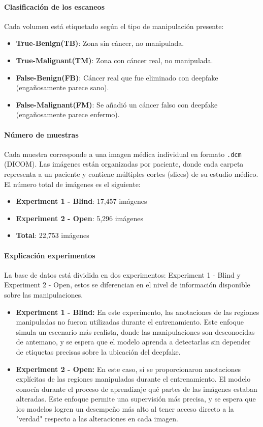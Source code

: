 \documentclass[conference]{IEEEtran}
\begin{document}
\paragraph{Clasificación de los escaneos}
Cada volumen está etiquetado según el tipo de manipulación presente:

\begin{itemize}
    \item \textbf{True-Benign(TB)}: Zona sin cáncer, no manipulada.
    \item \textbf{True-Malignant(TM)}: Zona con cáncer real, no manipulada.
    \item \textbf{False-Benign(FB)}: Cáncer real que fue eliminado con deepfake (engañosamente parece sano).
    \item \textbf{False-Malignant(FM)}: Se añadió un cáncer falso con deepfake (engañosamente parece enfermo).
\end{itemize}

\paragraph{Número de muestras}
Cada muestra corresponde a una imagen médica individual en formato \texttt{.dcm} (DICOM). Las imágenes están organizadas por paciente, donde cada carpeta representa a un paciente y contiene múltiples cortes (slices) de su estudio médico. El número total de imágenes es el siguiente:

\begin{itemize}
    \item \textbf{Experiment 1 - Blind}: 17,457 imágenes
    \item \textbf{Experiment 2 - Open}: 5,296 imágenes
    \item \textbf{Total}: 22,753 imágenes
\end{itemize}

\paragraph{Explicación experimentos}
La base de datos está dividida en dos experimentos: Experiment 1 - Blind y Experiment 2 - Open, estos se diferencian en el nivel de información disponible sobre las manipulaciones.

\begin{itemize}
\item \textbf{Experiment 1 - Blind:} En este experimento, las anotaciones de las regiones manipuladas no fueron utilizadas durante el entrenamiento. Este enfoque simula un escenario más realista, donde las manipulaciones son desconocidas de antemano, y se espera que el modelo aprenda a detectarlas sin depender de etiquetas precisas sobre la ubicación del deepfake.
\item \textbf{Experiment 2 - Open:} En este caso, sí se proporcionaron anotaciones explícitas de las regiones manipuladas durante el entrenamiento. El modelo conocía durante el proceso de aprendizaje qué partes de las imágenes estaban alteradas. Este enfoque permite una supervisión más precisa, y se espera que los modelos logren un desempeño más alto al tener acceso directo a la "verdad" respecto a las alteraciones en cada imagen.
\end{itemize}
\end{document}
